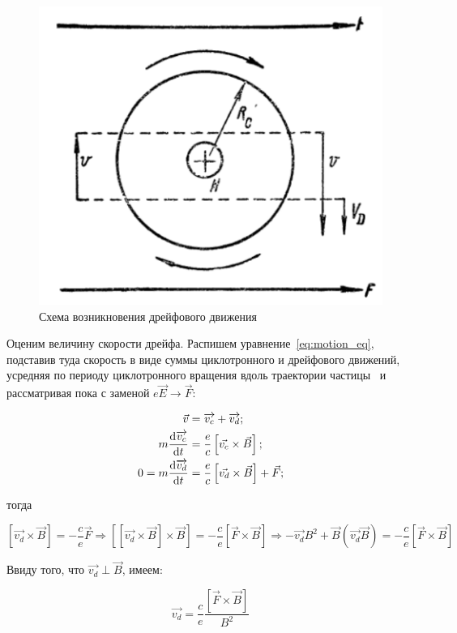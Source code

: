 \documentclass[10pt, a4paper]{article}
\begin{document}
\begin{figure}[ht]
	\begin{center}
		\includegraphics[width=0.5\linewidth]{drift.png}
	\end{center}	
	\caption{Схема возникновения дрейфового движения~\cite{frank}}
	\label{fig:drift_explanation}
\end{figure}

Оценим величину скорости дрейфа. Распишем уравнение~\eqref{eq:motion_eq}, подставив туда скорость в виде суммы циклотронного и дрейфового движений, усредняя по периоду циклотронного вращения вдоль траектории частицы~\cite{kotelnikov} и рассматривая пока с заменой $e\vec{E}\rightarrow\vec{F}$:

\begin{align*}
	\vec{v} &= \overrightarrow{v_c} + \overrightarrow{v_d};\\
	m\dv{\overrightarrow{v_c}}{t} &= \frac{e}{c}\left[\vec{v_c}\times\vec{B}\right];\\
	0=m\dv{\overrightarrow{v_d}}{t} &= \frac{e}{c}\left[\vec{v_d}\times\vec{B}\right]+\vec{F};
\end{align*} 

тогда

\begin{equation*}
	\left[\vec{v_d}\times\vec{B}\right]=-\frac{c}{e}\vec{F}\Rightarrow\left[ \left[\vec{v_d}\times\vec{B}\right]\times\vec{B}\right] =-\frac{c}{e}\left[\vec{F}\times\vec{B}\right]\Rightarrow-\overrightarrow{v_d}B^2+\vec{B}\left(\overrightarrow{v_d}\vec{B}\right)=-\frac{c}{e}\left[\vec{F}\times\vec{B}\right]
\end{equation*}

Ввиду того, что $\overrightarrow{v_d}\perp\vec{B}$, имеем:

\begin{equation} \label{eq:drift_common_eq}
	\overrightarrow{v_d} = \frac{c}{e}\frac{\left[\vec{F}\times\vec{B}\right]}{B^2}
\end{equation}
\end{document}
